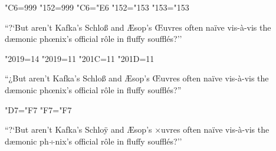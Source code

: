 \sfcode"C6=999
\sfcode"152=999
\lccode"C6="E6 %
\lccode"152="153 %
\lccode"153="153

``?`But aren't Kafka's Schloß and Æsop's Œuvres
often naïve vis-à-vis the dæmonic phœnix's official rôle
in fluffy soufflés?''

\kcatcode"2019=14
\catcode"2019=11
\catcode"201C=11
\catcode"201D=11

“¿But aren’t Kafka’s Schloß and Æsop’s Œuvres
often naïve vis-à-vis the dæmonic phœnix’s official rôle
in fluffy soufflés?”

{
\eclmr
\lccode"D7="F7 %
\lccode"F7="F7

``?`But aren't Kafka's Schlo^^ff and ^^c6sop's ^^d7uvres
often na^^efve vis-^^e0-vis the d^^e6monic ph^^f7nix's official r^^f4le
in fluffy souffl^^e9s?''
}

\bye
